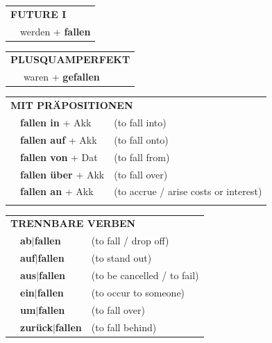 \documentclass[10pt,a4paper]{revtex4-2}
\begin{document}
\begin{verbbox}
\begin{tabular}{rl}
    \multicolumn{2}{l}{\textbf{FUTURE I} }\\
    &werden + \textbf{fallen}\\
 
  \end{tabular}
\hfill
   \begin{tabular}{rl}
      \multicolumn{2}{l}{\textbf{PLUSQUAMPERFEKT}}\\
    &waren + \textbf{gefallen}\\
  \end{tabular}

   \vspace{10pt}

   \begin{tabular}{lll}
      \multicolumn{3}{l}{\textbf{MIT PRÄPOSITIONEN}}\\
& \textbf{fallen in} + Akk & (to fall into)\\
& \textbf{fallen auf} + Akk & (to fall onto)\\
&\textbf{fallen von} + Dat & (to fall from)\\
&\textbf{fallen über} + Akk & (to fall over)\\
&\textbf{fallen an} + Akk & (to accrue / arise costs or interest)\\
\vspace{10pt} 
\end{tabular}
  \hfill
   \begin{tabular}{lll}
      \multicolumn{3}{l}{\textbf{TRENNBARE VERBEN}}\\
 & \textbf{ab$|$fallen} & (to fall / drop off)\\
  & \textbf{auf$|$fallen} & (to stand out)\\
   & \textbf{aus$|$fallen} & (to be cancelled / to fail)\\
   & \textbf{ein$|$fallen} & (to occur to someone)\\
    & \textbf{um$|$fallen} & (to fall over)\\
       & \textbf{zurück$|$fallen} & (to fall behind)\\
  \end{tabular}


  \vspace{-5pt}


\end{verbbox}
\end{document}
